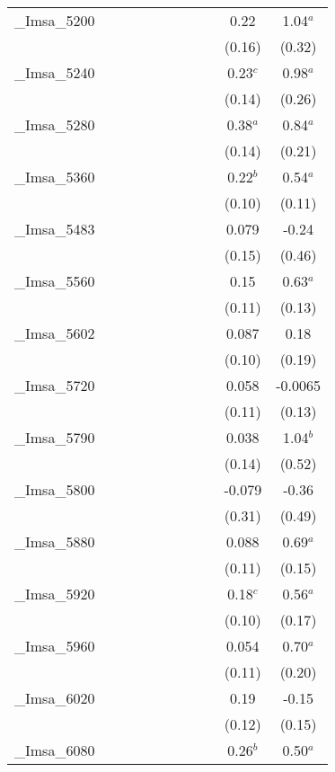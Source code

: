 \documentclass[]{article}
\begin{document}
\begin{tabular}{lcccccccccc}
\_Imsa\_5200 &  &  &  &  &  &  &  &  & 0.22 & 1.04$^a$ \\
 &  &  &  &  &  &  &  &  & (0.16) & (0.32) \\
\_Imsa\_5240 &  &  &  &  &  &  &  &  & 0.23$^c$ & 0.98$^a$ \\
 &  &  &  &  &  &  &  &  & (0.14) & (0.26) \\
\_Imsa\_5280 &  &  &  &  &  &  &  &  & 0.38$^a$ & 0.84$^a$ \\
 &  &  &  &  &  &  &  &  & (0.14) & (0.21) \\
\_Imsa\_5360 &  &  &  &  &  &  &  &  & 0.22$^b$ & 0.54$^a$ \\
 &  &  &  &  &  &  &  &  & (0.10) & (0.11) \\
\_Imsa\_5483 &  &  &  &  &  &  &  &  & 0.079 & -0.24 \\
 &  &  &  &  &  &  &  &  & (0.15) & (0.46) \\
\_Imsa\_5560 &  &  &  &  &  &  &  &  & 0.15 & 0.63$^a$ \\
 &  &  &  &  &  &  &  &  & (0.11) & (0.13) \\
\_Imsa\_5602 &  &  &  &  &  &  &  &  & 0.087 & 0.18 \\
 &  &  &  &  &  &  &  &  & (0.10) & (0.19) \\
\_Imsa\_5720 &  &  &  &  &  &  &  &  & 0.058 & -0.0065 \\
 &  &  &  &  &  &  &  &  & (0.11) & (0.13) \\
\_Imsa\_5790 &  &  &  &  &  &  &  &  & 0.038 & 1.04$^b$ \\
 &  &  &  &  &  &  &  &  & (0.14) & (0.52) \\
\_Imsa\_5800 &  &  &  &  &  &  &  &  & -0.079 & -0.36 \\
 &  &  &  &  &  &  &  &  & (0.31) & (0.49) \\
\_Imsa\_5880 &  &  &  &  &  &  &  &  & 0.088 & 0.69$^a$ \\
 &  &  &  &  &  &  &  &  & (0.11) & (0.15) \\
\_Imsa\_5920 &  &  &  &  &  &  &  &  & 0.18$^c$ & 0.56$^a$ \\
 &  &  &  &  &  &  &  &  & (0.10) & (0.17) \\
\_Imsa\_5960 &  &  &  &  &  &  &  &  & 0.054 & 0.70$^a$ \\
 &  &  &  &  &  &  &  &  & (0.11) & (0.20) \\
\_Imsa\_6020 &  &  &  &  &  &  &  &  & 0.19 & -0.15 \\
 &  &  &  &  &  &  &  &  & (0.12) & (0.15) \\
\_Imsa\_6080 &  &  &  &  &  &  &  &  & 0.26$^b$ & 0.50$^a$ \\

\end{tabular}
\end{document}
